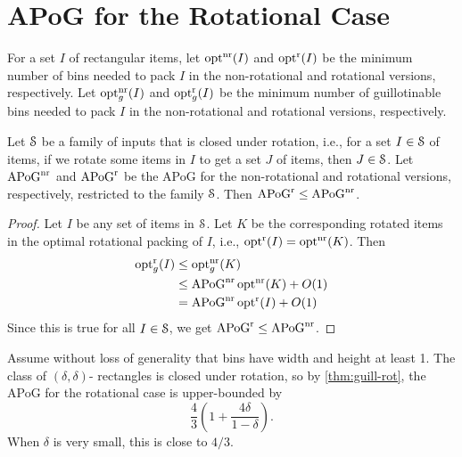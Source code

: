 \section{APoG for the Rotational Case}
\label{sec:guill-rot}

\begin{theorem}
\label{thm:guill-rot}
For a set $I$ of rectangular items,
let $\operatorname{opt}^{\mathrm{nr}}(I)$ and $\operatorname{opt}^{\mathrm{r}}(I)$ be the minimum number of bins
needed to pack $I$ in the non-rotational and rotational versions, respectively.
Let $\operatorname{opt}^{\mathrm{nr}}_g(I)$ and $\operatorname{opt}^{\mathrm{r}}_g(I)$ be the minimum number of guillotinable bins
needed to pack $I$ in the non-rotational and rotational versions, respectively.

Let $\mathcal{S}$ be a family of inputs that is closed under rotation, i.e.,
for a set $I \in \mathcal{S}$ of items, if we rotate some items in $I$ to get a set $J$ of items,
then $J \in \mathcal{S}$.
Let $\mathrm{APoG}^{\mathrm{nr}}$ and $\mathrm{APoG}^{\mathrm{r}}$ be the APoG for the non-rotational
and rotational versions, respectively, restricted to the family $\mathcal{S}$.
Then $\mathrm{APoG}^{\mathrm{r}} \le \mathrm{APoG}^{\mathrm{nr}}$.
\end{theorem}
\begin{proof}
Let $I$ be any set of items in $\mathcal{S}$. Let $K$ be the corresponding rotated items
in the optimal rotational packing of $I$, i.e., $\operatorname{opt}^{\mathrm{r}}(I) = \operatorname{opt}^{\mathrm{nr}}(K)$. Then
\begin{align*}
\operatorname{opt}^{\mathrm{r}}_g(I) &\le \operatorname{opt}^{\mathrm{nr}}_g(K)
\\ &\le \mathrm{APoG}^{\mathrm{nr}}\operatorname{opt}^{\mathrm{nr}}(K) + O(1)
\\ &= \mathrm{APoG}^{\mathrm{nr}}\operatorname{opt}^{\mathrm{r}}(I) + O(1)
\end{align*}
Since this is true for all $I \in \mathcal{S}$, we get $\mathrm{APoG}^{\mathrm{r}} \le \mathrm{APoG}^{\mathrm{nr}}$.
\end{proof}

Assume without loss of generality that bins have width and height at least 1.
The class of $(\delta, \delta)$-\thin{} rectangles is closed under rotation,
so by \cref{thm:guill-rot}, the APoG for the rotational case is upper-bounded by
\[ \frac{4}{3}\left(1+\frac{4\delta}{1-\delta}\right). \]
When $\delta$ is very small, this is close to $4/3$.
